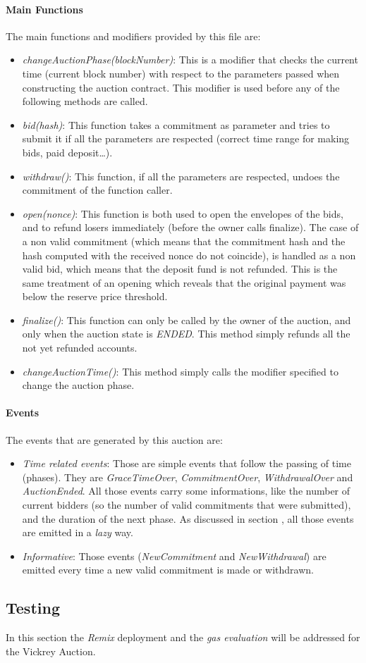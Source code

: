 \documentclass[11pt, a4paper]{report}
\begin{document}
	\paragraph{Main Functions}
	The main functions and modifiers provided by this file are:
	\begin{itemize}
		\item \emph{changeAuctionPhase(blockNumber)}: This is a modifier that checks the current time (current block number) with respect to the parameters passed when constructing the auction contract. This modifier is used before any of the following methods are called.
		\item \emph{bid(hash)}: This function takes a commitment as parameter and tries to submit it if all the parameters are respected (correct time range for making bids, paid deposit\dots).
		\item \emph{withdraw()}: This function, if all the parameters are respected, undoes the commitment of the function caller.  
		\item \emph{open(nonce)}: This function is both used to open the envelopes of the bids, and to refund losers immediately (before the owner calls finalize). The case of a non valid commitment (which means that the commitment hash and the hash computed with the received nonce do not coincide), is handled as a non valid bid, which means that the deposit fund is not refunded. This is the same treatment of an opening which reveals that the original payment was below the reserve price threshold.
		\item \emph{finalize()}: This function can only be called by the owner of the auction, and only when the auction state is \emph{ENDED}. This method simply refunds all the not yet refunded accounts.
		\item \emph{changeAuctionTime()}: This method simply calls the modifier specified to change the auction phase.
	\end{itemize}

	\paragraph*{Events}
	The events that are generated by this auction are:
	\begin{itemize}
		\item \emph{Time related events}: Those are simple events that follow the passing of time (phases). They are \emph{GraceTimeOver}, \emph{CommitmentOver}, \emph{WithdrawalOver} and \emph{AuctionEnded}. All those events carry some informations, like the number of current bidders (so the number of valid commitments that were submitted), and the duration of the next phase. As discussed in section , all those events are emitted in a \emph{lazy} way.
		\item \emph{Informative}: Those events (\emph{NewCommitment} and \emph{NewWithdrawal}) are emitted every time a new valid commitment is made or withdrawn.
	\end{itemize}
	
	\subsection*{Testing}
	In this section the \emph{Remix} deployment and the \emph{gas evaluation} will be addressed for the Vickrey Auction. \\ 

	
	
\end{document}
